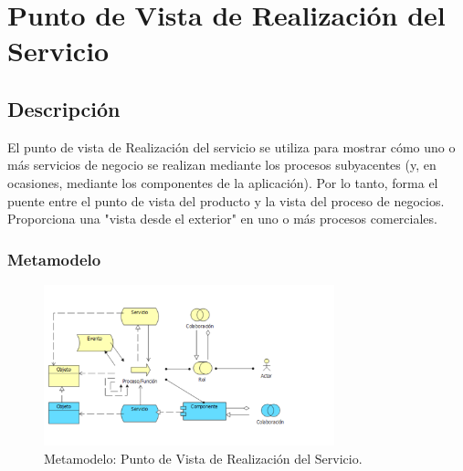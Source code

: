 \section{Punto de Vista de Realización del Servicio}
\subsection{Descripción}
El punto de vista de Realización del servicio se utiliza para mostrar cómo uno o más servicios de negocio se realizan mediante los procesos subyacentes (y, en ocasiones, mediante los componentes de la aplicación). Por lo tanto, forma el puente entre el punto de vista del producto y la vista del proceso de negocios. Proporciona una "vista desde el exterior" en uno o más procesos comerciales.

\subsubsection{Metamodelo}
\begin{figure}[h]
	\centering
	\includegraphics[width=0.75\textwidth]{imagenes/Metamodelos/Tecnologia/meta_realizacion_servicio.PDF}
	\caption{Metamodelo: Punto de Vista de Realización del Servicio.}
	\label{fig:gap_analysis}
\end{figure}

